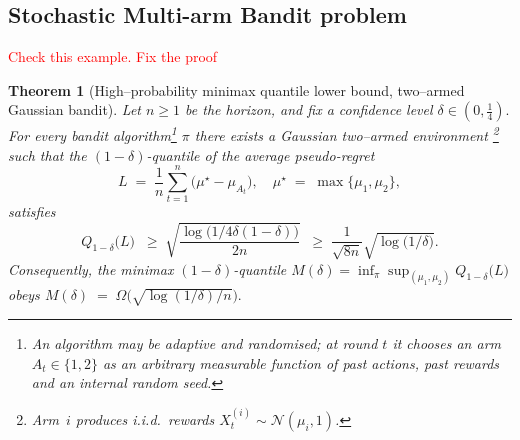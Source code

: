 \documentclass[conference]{IEEEtran}
\newtheorem{theorem}{Theorem}
\begin{document}
\subsection{Stochastic Multi-arm Bandit problem}
\textcolor{red}{Check this example. Fix the proof}
\begin{theorem}[High–probability minimax quantile lower bound, two–armed Gaussian bandit]%
\label{thm:minimax-quantile}
Let $n \ge 1$ be the horizon, and fix a confidence level 
\(
  \delta \in (0,\tfrac14).
\)
For every bandit algorithm\/\footnote{%
An algorithm may be adaptive and randomised; at round $t$ it chooses an arm 
$A_t\in\{1,2\}$ as an arbitrary measurable function of past actions, past rewards and an internal random seed.}
$\pi$ there exists a Gaussian two–armed environment%
\footnote{%
Arm~$i$ produces i.i.d.\ rewards $X_t^{(i)}\sim\mathcal N(\mu_i,1)$.
}
such that the \((1-\delta)\)-quantile of the average pseudo-regret
\[
  L \;=\; \frac1n\sum_{t=1}^{n}\bigl(\mu^{\star}-\mu_{A_t}\bigr),
  \quad
  \mu^{\star}\;=\;\max\{\mu_1,\mu_2\},
\]
satisfies
\[
  Q_{1-\delta}\!\bigl(L\bigr)
  \;\;\ge\;
  \sqrt{\frac{\log\bigl(1/4\delta(1-\delta)\bigr)}{2n}}
  \;\;\ge\;
  \frac{1}{\sqrt{8n}}\sqrt{\log\!\bigl(1/\delta\bigr)} .
\]
Consequently, the minimax $(1-\delta)$-quantile
\(
  M(\delta)=\inf_{\pi}\sup_{(\mu_1,\mu_2)}Q_{1-\delta}\bigl(L\bigr)
\)
obeys
\(
  M(\delta)\;=\;\Omega\!\bigl(\sqrt{\log(1/\delta)/n}\bigr).
\)
\end{theorem}
\end{document}
